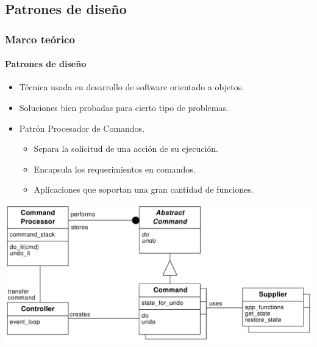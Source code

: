 \documentclass[xcolor=dvipsnames]{beamer}
\begin{document}
    \subsection{Patrones de diseño}
    \begin{frame}
        \frametitle{Marco teórico}
        \framesubtitle{Patrones de diseño}
        
        \begin{itemize}
            \item Técnica usada en desarrollo de software orientado a objetos.
            \item Soluciones bien probadas para cierto tipo de problemas.
            \item Patrón Procesador de Comandos.
            \begin{itemize}
                \item Separa la solicitud de una acción de su ejecución.
                \item Encapsula los requerimientos en comandos.
                \item Aplicaciones que soportan una gran cantidad de funciones.
            \end{itemize}

        \end{itemize}

        \vspace{0.3cm}
        \centering
        \includegraphics[height=0.6\textheight]{img/command_processor_class.png}
    \end{frame}
    
    \begin{frame}
        \centering \Large {}
        
    \end{frame}
    
\end{document}
